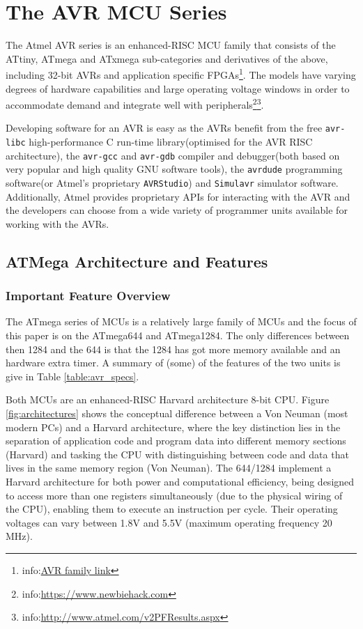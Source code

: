 \section{The AVR MCU Series}
\label{sec:atmega_overview}

	The Atmel AVR series is an enhanced-RISC MCU family that consists of the ATtiny, ATmega and ATxmega sub-categories and derivatives of the above, including 32-bit AVRs and application specific FPGAs\footnote{info:\href{http://www.atmel.com/products/microcontrollers/avr/default.aspx}{AVR family link}}. The models have varying degrees of hardware capabilities and large operating voltage windows in order to accommodate demand and integrate well with peripherals\footnote{info:\href{https://www.newbiehack.com/MicrocontrollersAlternativePowerSources.aspx}{https://www.newbiehack.com}}\footnote{info:\href{http://www.atmel.com/v2PFResults.aspx}{http://www.atmel.com/v2PFResults.aspx}}.
	
	Developing software for an AVR is easy as the AVRs benefit from the free \texttt{avr-libc} high-performance C run-time library(optimised for the AVR RISC architecture), the \texttt{avr-gcc} and \texttt{avr-gdb} compiler and debugger(both based on very popular and high quality GNU software tools), the \texttt{avrdude} programming software(or Atmel's proprietary \texttt{AVRStudio}) and \texttt{Simulavr} simulator software. Additionally, Atmel provides proprietary APIs for interacting with the AVR and the developers can choose from a wide variety of programmer units available for working with the AVRs\cite{book:practical_avr}.
	
	\subsection{ATMega Architecture and Features}				

	\subsubsection{Important Feature Overview}
	The ATmega series of MCUs is a relatively large family of MCUs and the focus of this paper is on the ATmega644 and ATmega1284. The only differences between then 1284 and the 644 is that the 1284 has got more memory available and an hardware extra timer. A summary of (some) of the features of the two units is give in Table \ref{table:avr_specs}\citep{atmega_manual}. 
	
	Both MCUs are an enhanced-RISC Harvard architecture 8-bit CPU. Figure \ref{fig:architectures} shows the conceptual difference between a Von Neuman (most modern PCs) and a Harvard architecture, where the key distinction lies in the separation of application code and program data into different memory sections (Harvard) and tasking the CPU with distinguishing between code and data that lives in the same memory region (Von Neuman). The 644/1284 implement a Harvard architecture for both power and computational efficiency, being designed to access more than one registers simultaneously (due to the physical wiring of the CPU), enabling them to execute an instruction per cycle. Their operating voltages can vary between 1.8V and 5.5V (maximum operating frequency 20 MHz).
	
